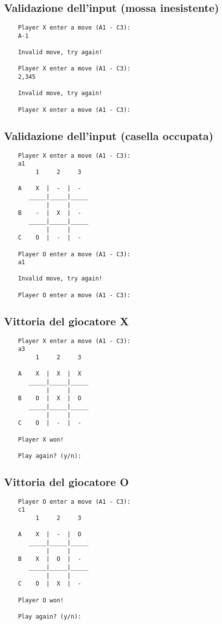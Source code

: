 \documentclass{article}
\begin{document}
\subsection{Validazione dell'input (mossa inesistente)}
    \begin{verbatim}
    Player X enter a move (A1 - C3): 
    A-1

    Invalid move, try again!

    Player X enter a move (A1 - C3): 
    2,345

    Invalid move, try again!

    Player X enter a move (A1 - C3): 
    \end{verbatim}

\subsection{Validazione dell'input (casella occupata)}
    \begin{verbatim}
    Player X enter a move (A1 - C3): 
    a1
         1     2     3

    A    X  |  -  |  -  
       _____|_____|_____
            |     |     
    B    -  |  X  |  -  
       _____|_____|_____
            |     |     
    C    O  |  -  |  -  

    Player O enter a move (A1 - C3): 
    a1

    Invalid move, try again!

    Player O enter a move (A1 - C3): 
    \end{verbatim}

\subsection{Vittoria del giocatore X}
    \begin{verbatim}
    Player X enter a move (A1 - C3): 
    a3
         1     2     3

    A    X  |  X  |  X  
       _____|_____|_____
            |     |     
    B    O  |  X  |  O  
       _____|_____|_____
            |     |     
    C    O  |  -  |  -  

    Player X won!

    Play again? (y/n):
    \end{verbatim}

\subsection{Vittoria del giocatore O}
    \begin{verbatim}
    Player O enter a move (A1 - C3): 
    c1
         1     2     3

    A    X  |  -  |  O  
       _____|_____|_____
            |     |     
    B    X  |  O  |  -  
       _____|_____|_____
            |     |     
    C    O  |  X  |  -  

    Player O won!

    Play again? (y/n):
    \end{verbatim}
\end{document}
